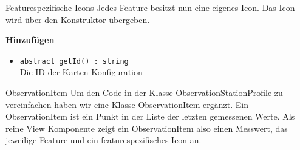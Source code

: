 \begin{Change}{Featurespezifische Icons}
    Jedes Feature besitzt nun eine eigenes Icon. Das Icon wird über den Konstruktor übergeben.

    \textbf{Hinzufügen}
    \begin{itemize}
        \item \texttt{abstract getId() : string}
        \\ Die ID der Karten-Konfiguration
    \end{itemize}
    
\end{Change}


\begin{Change}{ObservationItem}
    Um den Code in der Klasse ObservationStationProfile zu vereinfachen haben wir eine Klasse ObservationItem ergänzt. Ein ObservationItem ist ein Punkt in der Liste der letzten gemessenen Werte. Als reine View Komponente zeigt ein ObservationItem also einen Messwert, das jeweilige Feature und ein featurespezifisches Icon an.
\end{Change}
